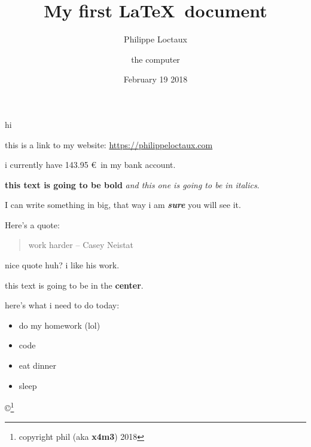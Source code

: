 \documentclass[a4paper]{article}
\title{My first \LaTeX\ document}
\author{Philippe Loctaux \and the computer}
\date{February 19 2018}
\begin{document}
\maketitle

hi

this is a link to my website: \url{https://philippeloctaux.com}

i currently have 143.95 \euro\ in my bank account.

\textbf{this text is going to be bold} \textit{and this one is going to be in italics}.

I can write something in {\huge big}, that way i am \textbf{\textit{sure}} you will see it.

Here's a quote:

\begin{quote}work harder -- Casey Neistat\end{quote}

nice quote huh? i like his work.

\begin{center}this text is going to be in the \textbf{center}.\end{center}

here's what i need to do today:
\begin{itemize}
\item do my homework (lol)
\item code
\item eat dinner
\item sleep
\end{itemize}

\copyright\footnote{copyright phil (aka \textbf{x4m3}) 2018}
\end{document}
